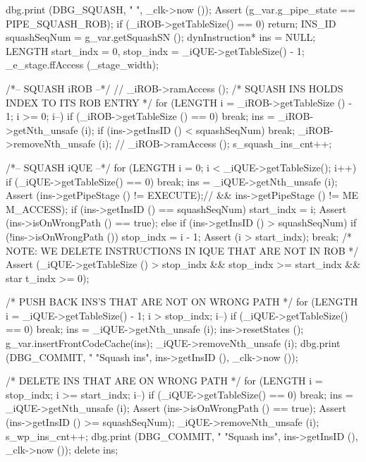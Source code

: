 \begin{DoxyCode}
                     {
    dbg.print (DBG_SQUASH, "%
      ", _clk->now ());
    Assert (g_var.g_pipe_state == PIPE_SQUASH_ROB);
    if (_iROB->getTableSize() == 0) return;
    INS_ID squashSeqNum = g_var.getSquashSN ();
    dynInstruction* ins = NULL;
    LENGTH start_indx = 0, stop_indx = _iQUE->getTableSize() - 1;
    _e_stage.ffAccess (_stage_width);

    /*-- SQUASH iROB --*/
//    _iROB->ramAccess (); /* SQUASH INS HOLDS INDEX TO ITS ROB ENTRY */
    for (LENGTH i = _iROB->getTableSize () - 1; i >= 0; i--) {
        if (_iROB->getTableSize () == 0) break;
        ins = _iROB->getNth_unsafe (i);
        if (ins->getInsID () < squashSeqNum) break;
        _iROB->removeNth_unsafe (i);
//        _iROB->ramAccess ();
        s_squash_ins_cnt++;
    }

    /*-- SQUASH iQUE --*/
    for (LENGTH i = 0; i < _iQUE->getTableSize(); i++) {
        if (_iQUE->getTableSize() == 0) break;
        ins = _iQUE->getNth_unsafe (i);
        Assert (ins->getPipeStage () != EXECUTE);// && ins->getPipeStage () != ME
      M_ACCESS);
        if (ins->getInsID () == squashSeqNum) {
            start_indx = i;
            Assert (ins->isOnWrongPath () == true);
        } else if (ins->getInsID () > squashSeqNum) {
            if (!ins->isOnWrongPath ()) {
                stop_indx = i - 1;
                Assert (i > start_indx);
                break;
            }
        }
    }
    /* NOTE: WE DELETE INSTRUCTIONS IN IQUE THAT ARE NOT IN ROB */
    Assert (_iQUE->getTableSize () > stop_indx && stop_indx >= start_indx && star
      t_indx >= 0);

    /* PUSH BACK INS'S THAT ARE NOT ON WRONG PATH */
    for (LENGTH i = _iQUE->getTableSize() - 1; i > stop_indx; i--) {
        if (_iQUE->getTableSize() == 0) break;
        ins = _iQUE->getNth_unsafe (i);
        ins->resetStates ();
        g_var.insertFrontCodeCache(ins);
        _iQUE->removeNth_unsafe (i);
        dbg.print (DBG_COMMIT, "%
                "Squash ins", ins->getInsID (), _clk->now ());
    }

    /* DELETE INS THAT ARE ON WRONG PATH */
    for (LENGTH i = stop_indx; i >= start_indx; i--) {
        if (_iQUE->getTableSize() == 0) break;
        ins = _iQUE->getNth_unsafe (i);
        Assert (ins->isOnWrongPath () == true);
        Assert (ins->getInsID () >= squashSeqNum);
        _iQUE->removeNth_unsafe (i);
        s_wp_ins_cnt++;
        dbg.print (DBG_COMMIT, "%
                "Squash ins", ins->getInsID (), _clk->now ());
        delete ins;
    }
}
\end{DoxyCode}


